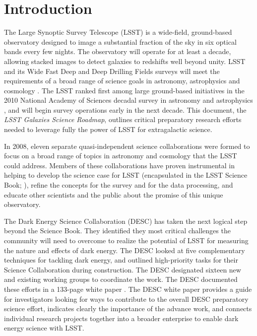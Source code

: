 
\makeatletter
\let\savedchap\@makechapterhead
\def\@makechapterhead{\vspace*{-3cm}\savedchap}
\chapter[Introduction]{Introduction}
\label{ch:intro}
\let\@makechapterhead\savedchap
\makeatletter

{\justify
The Large Synoptic Survey Telescope (LSST) is a wide-field, ground-based
observatory designed to image a substantial fraction of the sky in six optical
bands every few nights. 
The observatory will operate for at least a decade, allowing 
stacked images to detect galaxies to redshifts well beyond unity. LSST and
its Wide Fast Deep and Deep Drilling Fields surveys will meet 
the requirements of a broad range of science goals in astronomy, astrophysics and cosmology
\citep{ivezic2008a}. 
The LSST ranked first among large ground-based initiatives in the
2010 National Academy of Sciences decadal survey in astronomy and astrophysics \citep{nrc2010a},
and will begin survey operations early in the next decade.
This document, the {\it LSST Galaxies Science Roadmap}, outlines critical preparatory research efforts needed 
to leverage fully the power of LSST for extragalactic science. 

In 2008, eleven separate quasi-independent science collaborations were formed to
focus on a broad range of topics in astronomy and cosmology that the LSST could
address. Members of these collaborations have proven instrumental in helping to
develop the science case for LSST (encapsulated in the LSST Science Book;
\citealt{LSSTSciBook}), 
refine the concepts for the survey and for the data processing, and educate
other scientists and the public about the promise of this unique observatory.

The Dark Energy Science Collaboration (DESC) has taken the
next logical step beyond the Science Book. They identified they most critical
challenges the community will need to overcome
to realize the potential of LSST for
measuring the nature and effects of dark energy. The
DESC looked at five complementary
techniques for tackling dark energy, and outlined high-priority tasks for their
Science Collaboration during construction. The DESC designated sixteen 
new and existing working
groups to coordinate the work. The DESC documented these efforts
in a 133-page white paper \citep{LSSTDESC}. The DESC white
paper provides a guide for investigators looking for ways to contribute to the
overall DESC preparatory science effort, 
indicates clearly the importance of the advance work, and 
connects individual research projects together into a broader 
enterprise to enable dark energy science with LSST.

}
